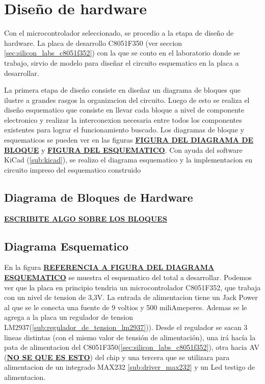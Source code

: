 \section{Dise\~no de hardware} %
\label{sec:diseno_de_hardware}


Con el microcontrolador seleccionado, se procedio a la etapa de dise\~no de hardware. La placa de desarrollo C8051F350 (ver seccion \ref{sec:silicon_labs_c8051f352}) con la que se conto en el laboratorio donde se trabajo, sirvio de modelo para dise\~nar el circuito esquematico en la placa a desarrollar.

La primera etapa de dise\~no consiste en dise\~nar un diagrama de bloques que ilustre a grandes rasgos la organizacion del circuito. Luego de esto se realiza el dise\~no esquematico que consiste en llevar cada bloque a nivel de componente electronico y realizar la interconexion necesaria entre todos los componentes existentes para lograr el funcionamiento buscado. Los diagramas de bloque y esquematicos se pueden ver en las figuras \underline{\textbf{FIGURA DEL DIAGRAMA DE BLOQUE}} y \underline{\textbf{FIGURA DEL ESQUEMATICO}}. Con ayuda del software KiCad (\ref{sub:kicad}), se realizo el diagrama esquematico y la implementacion en circuito impreso del esquematico construido

\subsection{Diagrama de Bloques de Hardware} %
\label{sub:diagrama_de_bloques_de_hardware}

\textbf{\underline{ESCRIBITE ALGO SOBRE LOS BLOQUES}}




\subsection{Diagrama Esquematico} %
\label{sub:diagrama_esquematico}

En la figura \textbf{\underline{REFERENCIA A FIGURA DEL DIAGRAMA ESQUEMATICO}} se muestra el esquematico del total a desarrollar. Podemos ver que la placa en principio tendria un microcontrolador C8051F352, que trabaja con un nivel de tension de 3,3V. La entrada de alimentacion tiene un Jack Power al que se le conecta una fuente de 9 voltios y 500 miliAmeperes. Ademas se le agrega a la placa un regulador de tension LM2937(\ref{sub:regulador_de_tension_lm2937})). Desde el regulador se sacan 3 lineas distintas (con el mismo valor de tensi\'on de alimentaci\'on), una ir\'a hacía la pata de alimentacion del C8051F350(\ref{sec:silicon_labs_c8051f352}), otra hacia AV (\textbf{\underline{NO SE QUE ES ESTO}}) del chip y una tercera que se utilizara para alimentacion de un integrado MAX232 \ref{sub:driver_max232} y un Led testigo de alimentacion.



